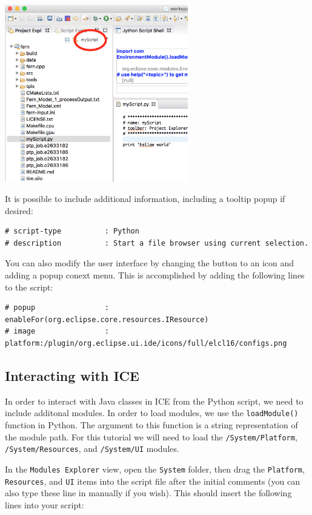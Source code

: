 \begin{center} \includegraphics[width=8cm]{images/scriptButton}
\end{center}

It is possible to include additional information, including a tooltip popup
if desired:

{\small
\begin{verbatim}
# script-type          : Python  
# description          : Start a file browser using current selection.  
\end{verbatim}
}

You can also modify the user interface by changing the button to
an icon and adding a popup conext menu. This is accomplished by adding the following lines
to the script:

{\small
\begin{verbatim}
# popup				   : enableFor(org.eclipse.core.resources.IResource) 
# image				   : platform:/plugin/org.eclipse.ui.ide/icons/full/elcl16/configs.png
\end{verbatim}
}

\subsection{Interacting with ICE}

In order to interact with Java classes in ICE from the Python script, we 
need to include additonal modules. In order to load modules,
we use the \texttt{loadModule()} function in Python. The argument to this function is a
string representation of the module path. For this tutorial we will need to load
the \texttt{/System/Platform}, \texttt{/System/Resources}, and
\texttt{/System/UI} modules.

In the \texttt{Modules Explorer} view, open the \texttt{System} folder, then drag
the \texttt{Platform}, \texttt{Resources}, and \texttt{UI} items
into the script file after the initial comments (you can also type these line
in manually if you wish).
This should insert the following lines into your script:

